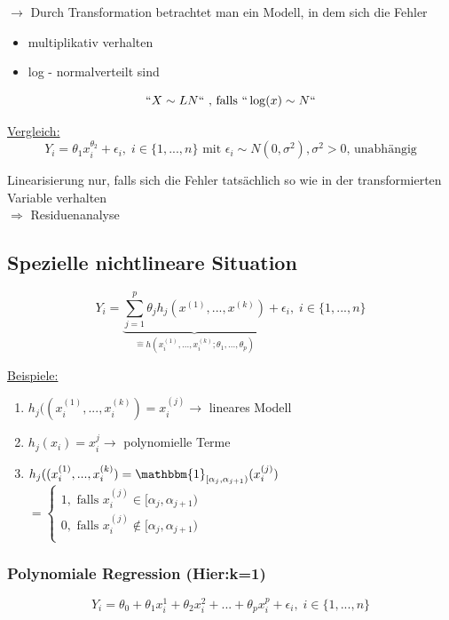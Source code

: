 $\rightarrow$ Durch Transformation betrachtet man ein Modell, in dem sich die Fehler
\begin{itemize}
 \item multiplikativ verhalten
 \item log - normalverteilt sind
\end{itemize}

\[``X \sim LN`` \text{ , falls } `` \log (x) \sim N `` \]

\underline{Vergleich:}
\[ Y_i= \theta_1 x_i^{\theta_2} + \epsilon_i , \; i \in \{1,...,n\} \text{ mit } \epsilon_i \sim N(0, \sigma^2), \sigma^2 > 0 \text{, unabhängig} \]

Linearisierung nur, falls sich die Fehler tatsächlich so wie in der transformierten Variable verhalten \\
$\Rightarrow$ Residuenanalyse

\subsection{Spezielle nichtlineare Situation}

\[Y_i = \underbrace{
\sum_{j=1}^{p} \theta_j h_j (x^{(1)},...,x^{(k)} )}
_{\mathrel{\widehat{=}}  h (x_i^{(1)},...,x_i^{(k)}; \theta_1,..., \theta_p) }
+ \epsilon_i , \; i \in \{1,...,n\} \]

\underline{Beispiele:}
\begin{enumerate} 
 \item $h_j((x_i^{(1)},...,x_i^{(k)}) = x_i^{(j)} \rightarrow$  lineares Modell
 \item $h_j(x_i) = x_i^{j} \rightarrow$ polynomielle Terme
 \item $h_j((x_i^{(1)},...,x_i^{(k)}) = \mathbbm{1}_{[\alpha_j,\alpha_{j+1})} (x_i^{(j)})$ \\
 $= \begin{cases}
 1, \text{ falls } x_i^{(j)} \in [\alpha_j,\alpha_{j+1}) \\
 0, \text{ falls } x_i^{(j)} \notin [\alpha_j,\alpha_{j+1}) \\
 \end{cases}$
\end{enumerate}

\subsubsection{Polynomiale Regression (Hier:k=1)}
\[Y_i = \theta_0 + \theta_1 x_i^1 +  \theta_2 x_i^2 + ... +  \theta_p x_i^p + \epsilon_i, \; i \in \{1,...,n\} \]

